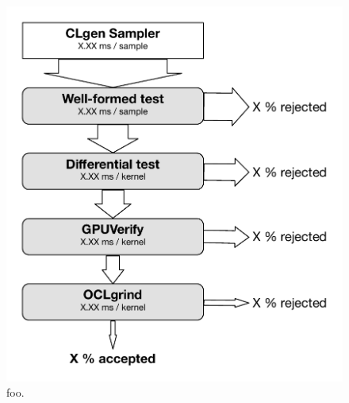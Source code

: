 \begin{figure}
        \centering
        \includegraphics[width=.8\columnwidth]{img/rej} %
        \caption{%
                foo.%
        }%
        \label{fig:deeptune}
\end{figure}

